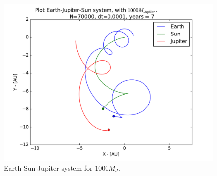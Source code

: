 \documentclass[12pt]{article}
\begin{document}
\begin{figure}[!h]
\centering
\includegraphics[width=\linewidth]{Plots/Earth_Sun_Jupiter_1000MJ.pdf}
\caption{Earth-Sun-Jupiter system for $1000M_J$.}
\label{fig:ESJ_1000MJ}
\end{figure}

\FloatBarrier
\end{document}
